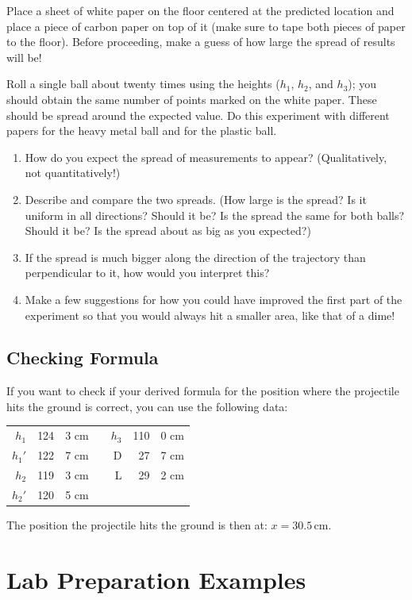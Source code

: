 Place a sheet of white paper on the floor centered at the predicted location and place a piece of carbon paper on top of it (make sure to tape both pieces of paper to the floor). Before proceeding, make a guess of how large the spread of results will be!\myskip

Roll a single ball about twenty times using the heights ($h_1$, $h_2$, and $h_3$); you should obtain the same number of points marked on the white paper. These should be spread around the expected value. Do this experiment with different papers for the heavy metal ball and for the plastic ball.
\begin{enumerate}
    \item How do you expect the spread of measurements to appear? (Qualitatively, not quantitatively!)
    \item Describe and compare the two spreads. (How large is the spread?  Is it uniform in all directions? Should it be?  Is the spread the same for both balls? Should it be? Is the spread about as big as you expected?)
    \item If the spread is much bigger along the direction of the trajectory than perpendicular to it, how would you interpret this?
    \item Make a few suggestions for how you could have improved the first part of the experiment so that you would always hit a smaller area, like that of a dime!
\end{enumerate}

\subsection{Checking Formula}
If you want to check if your derived formula for the position where the projectile hits the ground is correct, you can use the following data:
\begin{table}[h]
  \centering
  \begin{tabular}[h]{r@{=}r@{.}lcr@{=}r@{.}l}
    $h_{1}$&124&3 cm&&$h_{3}$&110&0 cm\\
    $h_{1}'$&122&7 cm&&D&27&7 cm\\
    $h_{2}$&119&3 cm&&L&29&2 cm\\
    $h_{2}'$&120&5 cm
  \end{tabular}
\end{table}
The position the projectile hits the ground is then at: $x  =  30.5\, \textrm{cm}$.
 
\section{Lab Preparation Examples}

